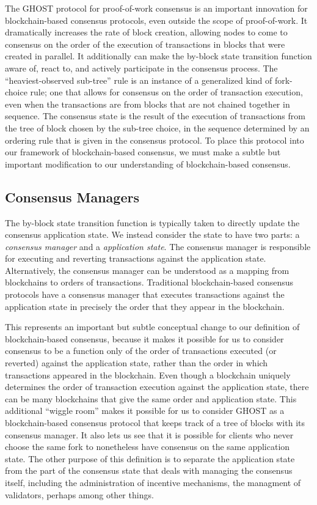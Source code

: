 \documentclass[11pt,a4paper]{article}
\begin{document}
The GHOST protocol for proof-of-work consensus\cite{GHOST} is an important innovation for blockchain-based consensus protocols, even outside the scope of proof-of-work. It dramatically increases the rate of block creation, allowing nodes to come to consensus on the order of the execution of transactions in blocks that were created in parallel. It additionally can make the by-block state transition function aware of, react to, and actively participate in the consensus process. The ``heaviest-observed sub-tree'' rule is an instance of a generalized kind of fork-choice rule; one that allows for consensus on the order of transaction execution, even when the transactions are from blocks that are not chained together in sequence. The consensus state is the result of the execution of transactions from the tree of block chosen by the sub-tree choice, in the sequence determined by an ordering rule that is given in the consensus protocol. To place this protocol into our framework of blockchain-based consensus, we must make a subtle but important modification to our understanding of blockchain-based consensus.


\subsection{Consensus Managers}

The by-block state transition function is typically taken to directly update the consensus application state. We instead consider the state to have two parts: a \emph{consensus manager} and a \emph{application state}. The consensus manager is responsible for executing and reverting transactions against the application state. Alternatively, the consensus manager can be understood as a mapping from blockchains to orders of transactions. Traditional blockchain-based consensus protocols have a consensus manager that executes transactions against the application state in precisely the order that they appear in the blockchain.

This represents an important but subtle conceptual change to our definition of blockchain-based consensus, because it makes it possible for us to consider consensus to be a function only of the order of transactions executed (or reverted) against the application state, rather than the order in which transactions appeared in the blockchain. Even though a blockchain uniquely determines the order of transaction execution against the application state, there can be many blockchains that give the same order and application state. This additional ``wiggle room'' makes it possible for us to consider GHOST as a blockchain-based consensus protocol that keeps track of a tree of blocks with its consensus manager. It also lets us see that it is possible for clients who never choose the same fork to nonetheless have consensus on the same application state. The other purpose of this definition is to separate the application state from the part of the consensus state that deals with managing the consensus itself, including the administration of incentive mechanisms, the managment of validators, perhaps among other things.
\end{document}
